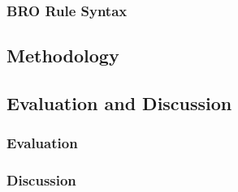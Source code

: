 \subsubsection{BRO Rule Syntax} 


\subsection{Methodology}\label{subsec:methodology}

\subsection{Evaluation and Discussion}\label{subsec:evaluation-discussion}
\subsubsection{Evaluation}\label{subsubsec:evalutation}
\subsubsection{Discussion}\label{subsubsec:discussion}
